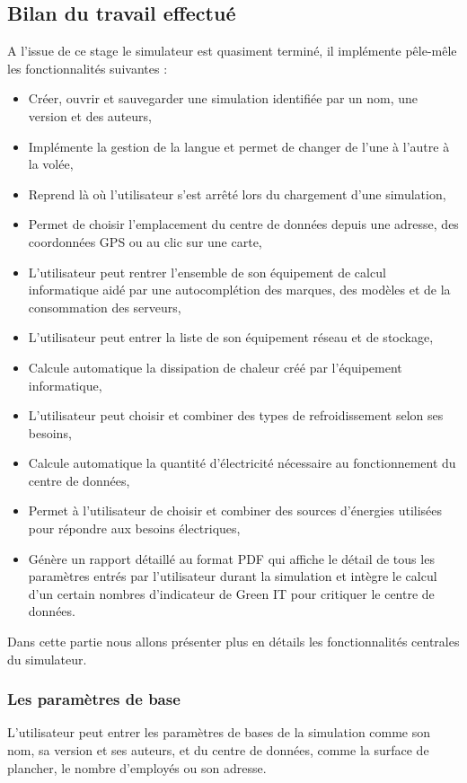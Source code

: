 \subsection{Bilan du travail effectué}
A l'issue de ce stage le simulateur est quasiment terminé, il implémente pêle-mêle les fonctionnalités suivantes :
\begin{itemize}
	\item Créer, ouvrir et sauvegarder une simulation identifiée par un nom, une version et des auteurs,
	\item Implémente la gestion de la langue et permet de changer de l'une à l'autre à la volée,
	\item Reprend là où l'utilisateur s'est arrêté lors du chargement d'une simulation,
	\item Permet de choisir l'emplacement du centre de données depuis une adresse, des coordonnées GPS ou au clic sur une carte,
	\item L'utilisateur peut rentrer l'ensemble de son équipement de calcul informatique aidé par une autocomplétion des marques, des modèles et de la consommation des serveurs,
	\item L'utilisateur peut entrer la liste de son équipement réseau et de stockage,
	\item Calcule automatique la dissipation de chaleur créé par l'équipement informatique,
	\item L'utilisateur peut choisir et combiner des types de refroidissement selon ses besoins,
	\item Calcule automatique la quantité d'électricité nécessaire au fonctionnement du centre de données,
	\item Permet à l'utilisateur de choisir et combiner des sources d'énergies utilisées pour répondre aux besoins électriques,
	\item Génère un rapport détaillé au format PDF qui affiche le détail de tous les paramètres entrés par l'utilisateur durant la simulation et intègre le calcul d'un certain nombres d'indicateur de Green IT pour critiquer le centre de données.\\
\end{itemize}
Dans cette partie nous allons présenter plus en détails les fonctionnalités centrales du simulateur.

\subsubsection{Les paramètres de base}
L'utilisateur peut entrer les paramètres de bases de la simulation comme son nom, sa version et ses auteurs, et du centre de données, comme la surface de plancher, le nombre d'employés ou son adresse.

